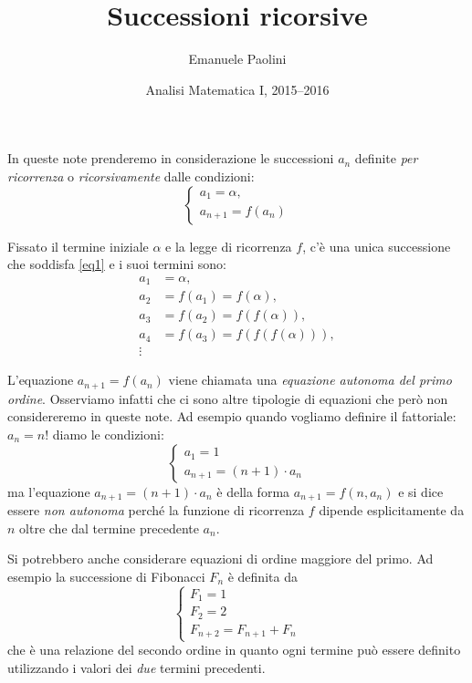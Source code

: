 \documentclass[italian,a4paper]{scrartcl}
\title{Successioni ricorsive}
\author{Emanuele Paolini}
\date{Analisi Matematica I, 2015--2016}
\begin{document}
\maketitle
In queste note prenderemo in considerazione le successioni $a_n$
definite \emph{per ricorrenza} o \emph{ricorsivamente} dalle condizioni:
\begin{equation}\label{eq1}
\begin{cases}
  a_1 = \alpha,\\
  a_{n+1} = f(a_n)
\end{cases}
\end{equation}

Fissato il termine iniziale $\alpha$ e la legge di ricorrenza $f$,
c'è una unica successione che soddisfa \eqref{eq1} e i suoi termini
sono:
\begin{align*}
a_1 & =\alpha,\\
a_2 &= f(a_1)=f(\alpha),\\
a_3 &= f(a_2)=f(f(\alpha)),\\
a_4 &= f(a_3)=f(f(f(\alpha))),\\
\vdots
\end{align*}

L'equazione $a_{n+1} = f(a_n)$ viene chiamata una \emph{equazione
  autonoma del primo ordine}. Osserviamo infatti
che ci sono altre tipologie di equazioni che però
non considereremo in queste note. Ad esempio quando vogliamo definire
il fattoriale: $a_n = n!$ diamo le condizioni:
\[
\begin{cases}
  a_1 = 1\\
  a_{n+1} = (n+1) \cdot a_n
\end{cases}
\]
ma l'equazione $a_{n+1} = (n+1) \cdot a_n$ è della forma $a_{n+1} =
f(n, a_n)$ e si dice essere \emph{non autonoma} perché la funzione di
ricorrenza $f$ dipende esplicitamente da $n$ oltre che dal termine
precedente $a_n$.

Si potrebbero anche considerare equazioni di ordine maggiore del
primo. Ad esempio la successione di Fibonacci $F_n$ è definita da
\[
\begin{cases}
  F_1 = 1 \\
  F_2 = 2 \\
  F_{n+2} = F_{n+1} + F_n
\end{cases}
\]
che è una relazione del secondo ordine in quanto ogni termine può
essere definito utilizzando i valori dei \emph{due} termini precedenti.
\end{document}
